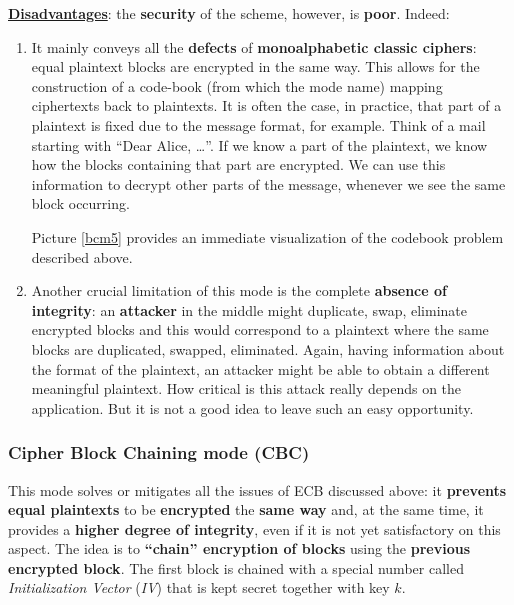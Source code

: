 \underline{\textbf{Disadvantages}}: the \textbf{security} of the scheme, however, is \textbf{poor}. Indeed:

\begin{enumerate}
    \item It mainly conveys all the \textbf{defects} of \textbf{monoalphabetic classic ciphers}: equal plaintext blocks are encrypted in the same way. This allows for the construction of a code-book (from which the mode name) mapping ciphertexts back to plaintexts. It is often the case, in practice, that part of a plaintext is fixed due to the message format, for example. Think of a mail starting with “Dear Alice, …”. If we know a part of the plaintext, we know how the blocks containing that part are encrypted. We can use this information to decrypt other parts of the message, whenever we see the same block occurring.

    Picture \ref{bcm5} provides an immediate visualization of the codebook problem described above.


    \item Another crucial limitation of this mode is the complete \textbf{absence of integrity}: an \textbf{attacker} in the middle might duplicate, swap, eliminate encrypted blocks and this would correspond to a plaintext where the same blocks are duplicated, swapped, eliminated. Again, having information about the format of the plaintext, an attacker might be able to obtain a different meaningful plaintext. How critical is this attack really depends on the application. But it is not a good idea to leave such an easy opportunity.
    
\end{enumerate}

\subsubsection{Cipher Block Chaining mode (CBC)}
This mode solves or mitigates all the issues of ECB discussed above: it \textbf{prevents} \textbf{equal plaintexts} to be \textbf{encrypted} the \textbf{same way} and, at the same time, it provides a \textbf{higher degree of integrity}, even if it is not yet satisfactory on this aspect. The idea is to \textbf{“chain” encryption of blocks} using the \textbf{previous encrypted block}. The first block is chained with a special number called \textit{Initialization Vector} (\textit{IV}) that is kept secret together with key $k$.


